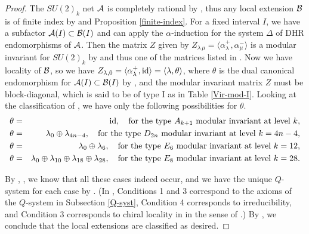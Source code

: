 \documentclass[12pt]{article}
\def\lan{\langle}
\def\ran{\rangle}
\def\id{{\rm id}}
\def\a{\alpha}
\def\la{\lambda}
\def\th{\theta}
\def\N{{\cal A}}
\def\M{{\cal B}}
\begin{document}
\begin{proof}
The $SU(2)_k$ net $\N$ is
completely rational by \cite{X3}, thus any local
extension $\M$ is of finite index by \cite[Corollary 39]{KLM}
and Proposition \ref{finite-index}.
For a fixed interval $I$, we have a subfactor $\N(I)\subset \M(I)$ and
can apply the $\a$-induction for the system $\Delta$ of DHR endomorphisms
of $\N$.  Then the matrix $Z$ given by
$Z_{\la\,\mu}=\lan \a^+_\la,\a^-_\mu\ran$
is a modular invariant for $SU(2)_k$
by \cite[Corollary 5.8]{BEK1} and thus one of
the matrices listed in \cite{CIZ}.  Now we have locality of $\M$, so 
we have $Z_{\la,0}=\lan \a^+_\la,\id\ran=\lan \la,\th\ran$,
where $\th$ is the dual canonical endomorphism for $\N(I)\subset \M(I)$
by \cite{X1}, and the modular invariant matrix $Z$ must be
block-diagonal, which is said to be of type I as in Table \ref{Vir-mod-I}.
Looking at the classification of \cite{CIZ}, we have only the following
possibilities for $\th$.
\begin{eqnarray*}
\th&=&\id,\quad
\text{for the type $A_{k+1}$ modular invariant at level $k$},\\
\th&=&\la_0\oplus\la_{4n-4},\quad
\text{for the type $D_{2n}$ modular invariant at level $k=4n-4$},\\
\th&=&\la_0\oplus\la_6,\quad
\text{for the type $E_6$ modular invariant at level $k=12$},\\
\th&=&\la_0\oplus\la_{10}\oplus\la_{18}\oplus\la_{28},\quad
\text{for the type  $E_8$ modular invariant at level $k=28$}.
\end{eqnarray*}

By \cite{X1}, \cite[II, Section 3]{BE}, we know that all these cases
indeed occur, and we have the unique $Q$-system for each case by 
\cite[Section 6]{KO}.
(In \cite[Definition 1.1]{KO}, Conditions 1 and 3 correspond to the
axioms of the $Q$-system in Subsection \ref{Q-syst}, Condition 4
corresponds to irreducibility, and Condition 3 corresponds to
chiral locality in \cite[Theorem 4.9]{LR}
in the sense of \cite[page 454]{BEK1}.)
By \cite[Theorem 4.9]{LR}, we conclude that the local
extensions are classified as desired.
\end{proof}
\end{document}

